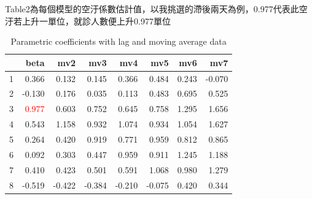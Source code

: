 \documentclass[a4paper, 12pt]{article}
\begin{document}
\begin{table}[h]
Table2為每個模型的空汙係數估計值，以我挑選的滯後兩天為例，0.977代表此空汙若上升一單位，就診人數便上升0.977單位\\
\centering
\caption{Parametric coefficients with lag and moving average data}
\begin{tabular}{rrrrrrrr}
  \hline
 & beta & mv2 & mv3 & mv4 & mv5 & mv6 & mv7 \\
  \hline
1 & 0.366 & 0.132 & 0.145 & 0.366 & 0.484 & 0.243 & -0.070 \\
  2 & -0.130 & 0.176 & 0.035 & 0.113 & 0.483 & 0.695 & 0.525 \\
  3 & \textcolor{red}{0.977} & 0.603 & 0.752 & 0.645 & 0.758 & 1.295 & 1.656 \\
  4 & 0.543 & 1.158 & 0.932 & 1.074 & 0.934 & 1.054 & 1.627 \\
  5 & 0.264 & 0.420 & 0.919 & 0.771 & 0.959 & 0.812 & 0.865 \\
  6 & 0.092 & 0.303 & 0.447 & 0.959 & 0.911 & 1.245 & 1.188 \\
  7 & 0.410 & 0.423 & 0.501 & 0.591 & 1.068 & 0.980 & 1.279 \\
  8 & -0.519 & -0.422 & -0.384 & -0.210 & -0.075 & 0.420 & 0.344 \\
   \hline
\end{tabular}
\end{table}
\end{document}
